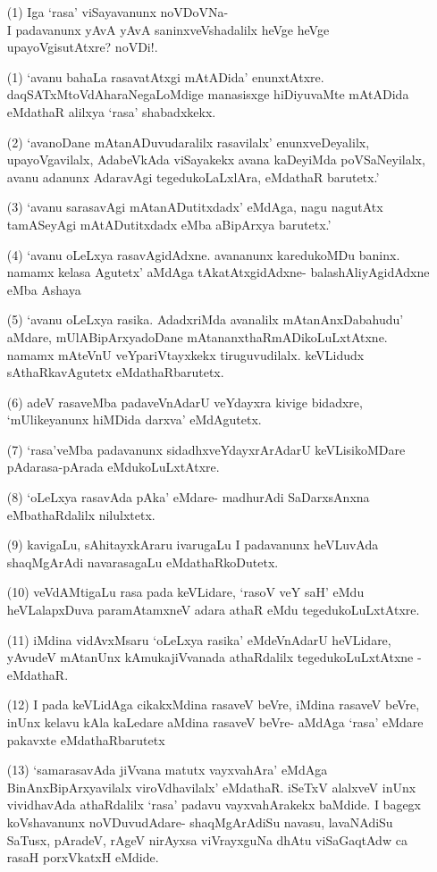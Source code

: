 \begin{itemize}
\item[(1)] Iga `rasa' viSayavanunx noVDoVNa-\\
I padavanunx yAvA yAvA saninxveVshadalilx heVge heVge upayoVgisutAtxre? noVDi!.
\item[(1)] `avanu bahaLa rasavatAtxgi mAtADida' enunxtAtxre. daqSATxMtoVdAharaNegaLoMdige manasisxge hiDiyuvaMte mAtADida eMdathaR alilxya `rasa' shabadxkekx.
\item[(2)] `avanoDane mAtanADuvudaralilx rasavilalx' enunxveDeyalilx, upayoVgavilalx, AdabeVkAda viSayakekx avana kaDeyiMda poVSaNeyilalx, avanu adanunx AdaravAgi tegedukoLaLxlAra, eMdathaR barutetx.'
\item[(3)] `avanu sarasavAgi mAtanADutitxdadx' eMdAga, nagu nagutAtx tamASeyAgi mAtADutitxdadx eMba aBipArxya barutetx.'
\item[(4)] `avanu oLeLxya rasavAgidAdxne. avananunx karedukoMDu baninx. namamx kelasa Agutetx' aMdAga tAkatAtxgidAdxne- balashAliyAgidAdxne eMba Ashaya
\item[(5)] `avanu oLeLxya rasika. AdadxriMda avanalilx mAtanAnxDabahudu' aMdare, mUlABipArxyadoDane mAtananxthaRmADikoLuLxtAtxne. namamx mAteVnU veYpariVtayxkekx tiruguvudilalx. keVLidudx sAthaRkavAgutetx eMdathaRbarutetx.
\item[(6)] adeV rasaveMba padaveVnAdarU veYdayxra kivige bidadxre, `mUlikeyanunx hiMDida darxva' eMdAgutetx.
\item[(7)] `rasa'veMba padavanunx sidadhxveYdayxrArAdarU keVLisikoMDare pAdarasa-pArada eMdukoLuLxtAtxre.
\item[(8)] `oLeLxya rasavAda pAka' eMdare- madhurAdi SaDarxsAnxna eMbathaRdalilx nilulxtetx.
\item[(9)] kavigaLu, sAhitayxkAraru ivarugaLu I padavanunx heVLuvAda shaqMgArAdi navarasagaLu eMdathaRkoDutetx.
\item[(10)] veVdAMtigaLu rasa pada keVLidare, `rasoV veY saH'\label{223} eMdu heVLalapxDuva paramAtamxneV adara athaR eMdu tegedukoLuLxtAtxre.
\item[(11)] iMdina vidAvxMsaru `oLeLxya rasika' eMdeVnAdarU heVLidare, yAvudeV mAtanUnx kAmukajiVvanada athaRdalilx tegedukoLuLxtAtxne - eMdathaR.
\item[(12)] I pada keVLidAga cikakxMdina rasaveV beVre, iMdina rasaveV beVre, inUnx kelavu kAla kaLedare aMdina rasaveV beVre- aMdAga `rasa' eMdare pakavxte eMdathaRbarutetx
\item[(13)] `samarasavAda jiVvana matutx vayxvahAra' eMdAga BinAnxBipArxyavilalx viroVdhavilalx' eMdathaR. iSeTxV alalxveV inUnx vividhavAda athaRdalilx `rasa' padavu vayxvahArakekx baMdide. I bagegx koVshavanunx noVDuvudAdare- shaqMgArAdiSu navasu, lavaNAdiSu SaTusx, pAradeV, rAgeV nirAyxsa viVrayxguNa dhAtu viSaGaqtAdw ca rasaH porxVkatxH eMdide.
\end{itemize}

